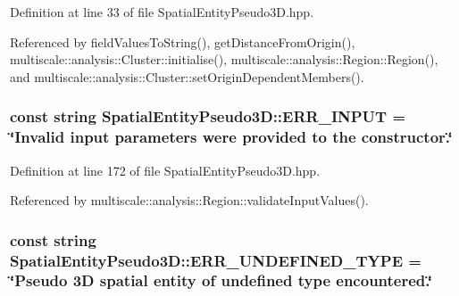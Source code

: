 \-Definition at line 33 of file \-Spatial\-Entity\-Pseudo3\-D.\-hpp.



\-Referenced by field\-Values\-To\-String(), get\-Distance\-From\-Origin(), multiscale\-::analysis\-::\-Cluster\-::initialise(), multiscale\-::analysis\-::\-Region\-::\-Region(), and multiscale\-::analysis\-::\-Cluster\-::set\-Origin\-Dependent\-Members().

\hypertarget{classmultiscale_1_1analysis_1_1SpatialEntityPseudo3D_a5882e2e18343ccee821f1bd6b9c23724}{
\subsubsection[{\-E\-R\-R\-\_\-\-I\-N\-P\-U\-T}]{\setlength{\rightskip}{0pt plus 5cm}const string {\bf \-Spatial\-Entity\-Pseudo3\-D\-::\-E\-R\-R\-\_\-\-I\-N\-P\-U\-T} = \char`\"{}\-Invalid input parameters were provided to the constructor.\char`\"{}}}\label{classmultiscale_1_1analysis_1_1SpatialEntityPseudo3D_a5882e2e18343ccee821f1bd6b9c23724}


\-Definition at line 172 of file \-Spatial\-Entity\-Pseudo3\-D.\-hpp.



\-Referenced by multiscale\-::analysis\-::\-Region\-::validate\-Input\-Values().

\hypertarget{classmultiscale_1_1analysis_1_1SpatialEntityPseudo3D_ad16aacdb05ba1922124c6b6c76077d32}{
\subsubsection[{\-E\-R\-R\-\_\-\-U\-N\-D\-E\-F\-I\-N\-E\-D\-\_\-\-T\-Y\-P\-E}]{\setlength{\rightskip}{0pt plus 5cm}const string {\bf \-Spatial\-Entity\-Pseudo3\-D\-::\-E\-R\-R\-\_\-\-U\-N\-D\-E\-F\-I\-N\-E\-D\-\_\-\-T\-Y\-P\-E} = \char`\"{}\-Pseudo 3\-D spatial entity of undefined type encountered.\char`\"{}}}\label{classmultiscale_1_1analysis_1_1SpatialEntityPseudo3D_ad16aacdb05ba1922124c6b6c76077d32}


